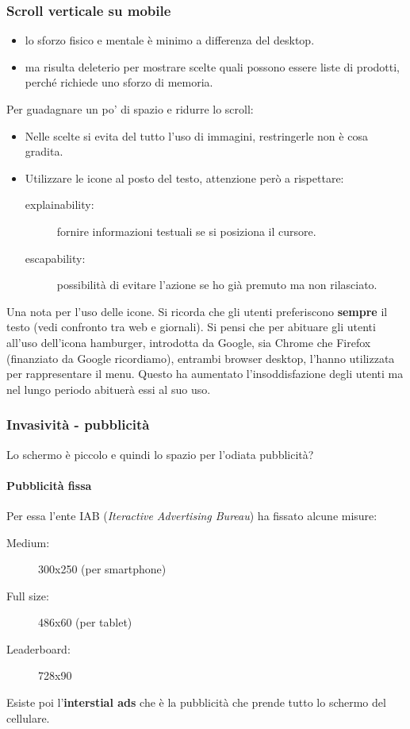 			\subsubsection{Scroll verticale su mobile}
				\begin{itemize}
					\item lo sforzo fisico e mentale è minimo a differenza del desktop.
					\item ma risulta deleterio per mostrare scelte quali possono essere liste di prodotti, perché richiede uno sforzo di memoria.
				\end{itemize}
				Per guadagnare un po' di spazio e ridurre lo scroll:
				\begin{itemize}
					\item Nelle scelte si evita del tutto l'uso di immagini, restringerle non è cosa gradita.
					\item Utilizzare le icone al posto del testo, attenzione però a rispettare:
					\begin{description}
						\item [explainability:] fornire informazioni testuali se si posiziona il cursore.
						\item [escapability:] possibilità di evitare l'azione se ho già premuto ma non rilasciato. 
					\end{description}
				\end{itemize}	
				
				Una nota per l'uso delle icone. Si ricorda che gli utenti preferiscono \textbf{sempre} il testo (vedi confronto tra web e giornali). Si pensi che per abituare gli utenti all'uso dell'icona hamburger, introdotta da Google, sia Chrome che Firefox (finanziato da Google ricordiamo), entrambi browser desktop, l'hanno utilizzata per rappresentare il menu. Questo ha aumentato l'insoddisfazione degli utenti ma nel lungo periodo abituerà essi al suo uso.
		
			\subsubsection{Invasività - pubblicità}
				Lo schermo è piccolo e quindi lo spazio per l'odiata pubblicità?
				
				\paragraph{Pubblicità fissa}
					Per essa l'ente IAB (\emph{Iteractive Advertising Bureau}) ha fissato alcune misure:
				\begin{description}
					\item[Medium:] 300x250 (per smartphone)
					\item[Full size:] 486x60 (per tablet)
					\item[Leaderboard:] 728x90
				\end{description}
				Esiste poi l'\textbf{interstial ads} che è la pubblicità che prende tutto lo schermo del cellulare. 
				
